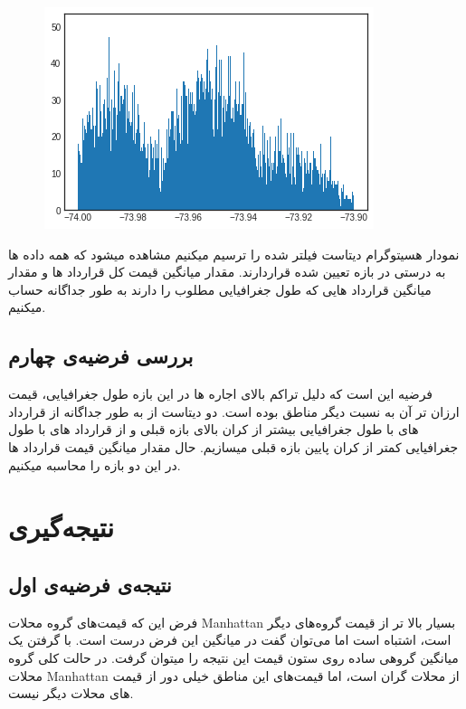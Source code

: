 \documentclass[table]{article}
\begin{document}
	\begin{figure}[h!]
		\centering
		\includegraphics[scale=.6]{./graph10.png}
		\caption{}
	\end{figure}
	
	نمودار هسیتوگرام دیتاست فیلتر شده را ترسیم میکنیم مشاهده میشود که همه داده ها به درستی در بازه تعیین شده قراردارند. مقدار میانگین قیمت کل قرارداد ها و مقدار میانگین قرارداد هایی که طول جغرافیایی مطلوب را دارند به طور جداگانه حساب میکنیم. 
	
	\begin{LTR}
		
	\end{LTR}
	
	\subsection{بررسی فرضیه‌ی چهارم}
	فرضیه این است که دلیل تراکم بالای اجاره ها در این بازه طول جغرافیایی، قیمت ارزان تر آن به نسبت دیگر مناطق بوده است. دو دیتاست از به طور جداگانه از قرارداد های با طول جغرافیایی بیشتر از کران بالای بازه قبلی و از قرارداد های با طول جغرافیایی کمتر از کران پایین بازه قبلی میسازیم. حال مقدار میانگین قیمت قرارداد ها در این دو بازه را محاسبه میکنیم.
	
	\begin{LTR}
		
	\end{LTR}
	
	\section{نتیجه‌گیری}
	\subsection{نتیجه‌ی فرضیه‌ی اول}
	فرض این که قیمت‌های گروه محلات Manhattan بسیار بالا تر از قیمت گروه‌های دیگر است، اشتباه است اما می‌توان گفت در میانگین این فرض درست است. با گرفتن یک میانگین گروهی ساده روی ستون قیمت این نتیجه را میتوان گرفت. در حالت کلی گروه محلات Manhattan از محلات گران است، اما قیمت‌های این مناطق خیلی دور از قیمت های محلات دیگر نیست.
\end{document}
